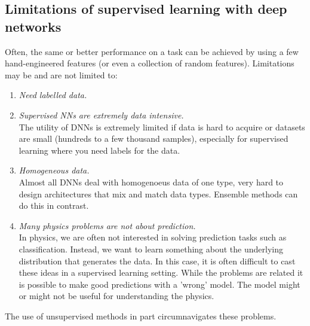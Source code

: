 \subsection{Limitations of supervised learning with deep networks}
\label{sec:dnn2Limitations}
Often, the same or better performance on a task can be achieved by using a few hand-engineered features (or even a collection of random features). Limitations may be and are not limited to:
\begin{enumerate}
	\item \emph{Need labelled data.}
	\item \emph{Supervised NNs are extremely data intensive.}\\
	The utility of DNNs is extremely limited if data is hard to acquire or datasets are small (hundreds to a few thousand samples), especially for supervised learning where you need labels for the data.
	\item \emph{Homogeneous data.}\\
	Almost all DNNs deal with homogenoeus data of one type, very hard to design architectures that mix and match data types. Ensemble methods can do this in contrast.
	\item\emph{Many physics problems are not about prediction.}\\
	In physics, we are often not interested in solving prediction tasks such as classification. Instead, we want to learn something about the underlying distribution that generates the data. In this case, it is often difficult to cast these ideas in a supervised learning setting. While the problems are related it is possible to make good predictions with a ’wrong’ model. The model might or might not be useful for understanding the physics.	
\end{enumerate}
The use of unsupervised methods in part circumnavigates these problems.
















































